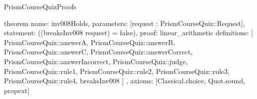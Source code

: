 \begin{lexlean}{PrismCourseQuizProofs}
\begin{semanticmodule}
theorem{
  name: inv008Holds,
  parameters: [request : PrismCourseQuiz::Request],
  statement: ((breaksInv008 request) = false),
  proof: linear_arithmetic{
    definitions: [
      PrismCourseQuiz::answerA,
      PrismCourseQuiz::answerB,
      PrismCourseQuiz::answerC,
      PrismCourseQuiz::answerCorrect,
      PrismCourseQuiz::answerIncorrect,
      PrismCourseQuiz::judge,
      PrismCourseQuiz::rule1,
      PrismCourseQuiz::rule2,
      PrismCourseQuiz::rule3,
      PrismCourseQuiz::rule4,
      breaksInv008
    ]
  },
  axioms: [Classical.choice, Quot.sound, propext]
}
\end{semanticmodule}
\end{lexlean}
